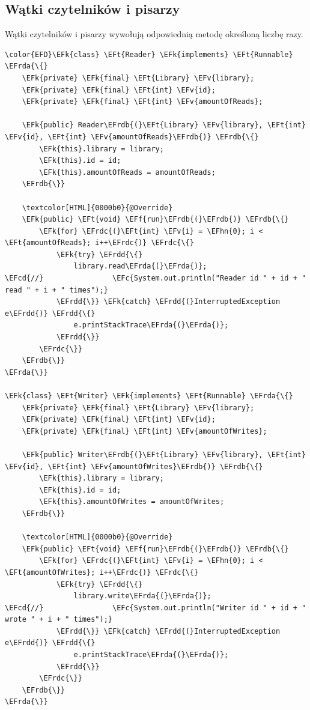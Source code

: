\documentclass[11pt]{article}
\newcommand{\EFc}[1]{\textcolor{EFc}{\textit{#1}}} %
\newcommand{\EFcd}[1]{\textcolor{EFcd}{\textit{#1}}} %
\newcommand{\EFk}[1]{\textcolor{EFk}{#1}} %
\newcommand{\EFf}[1]{\textcolor{EFf}{#1}} %
\newcommand{\EFv}[1]{\textcolor{EFv}{#1}} %
\newcommand{\EFt}[1]{\textcolor{EFt}{#1}} %
\newcommand{\EFhn}[1]{\textcolor{EFhn}{#1}} %
\newcommand{\EFrda}[1]{#1} %
\newcommand{\EFrdb}[1]{\textcolor{EFrdb}{#1}} %
\newcommand{\EFrdc}[1]{\textcolor{EFrdc}{#1}} %
\newcommand{\EFrdd}[1]{\textcolor{EFrdd}{#1}} %
\begin{document}
\subsection*{Wątki czytelników i pisarzy}
\label{sec:org8f20789}
Wątki czytelników i pisarzy wywołują odpowiednią metodę określoną liczbę razy.

\begin{Code}
\begin{Verbatim}
\color{EFD}\EFk{class} \EFt{Reader} \EFk{implements} \EFt{Runnable} \EFrda{\{}
    \EFk{private} \EFk{final} \EFt{Library} \EFv{library};
    \EFk{private} \EFk{final} \EFt{int} \EFv{id};
    \EFk{private} \EFk{final} \EFt{int} \EFv{amountOfReads};

    \EFk{public} Reader\EFrdb{(}\EFt{Library} \EFv{library}, \EFt{int} \EFv{id}, \EFt{int} \EFv{amountOfReads}\EFrdb{)} \EFrdb{\{}
        \EFk{this}.library = library;
        \EFk{this}.id = id;
        \EFk{this}.amountOfReads = amountOfReads;
    \EFrdb{\}}

    \textcolor[HTML]{0000b0}{@Override}
    \EFk{public} \EFt{void} \EFf{run}\EFrdb{(}\EFrdb{)} \EFrdb{\{}
        \EFk{for} \EFrdc{(}\EFt{int} \EFv{i} = \EFhn{0}; i < \EFt{amountOfReads}; i++\EFrdc{)} \EFrdc{\{}
            \EFk{try} \EFrdd{\{}
                library.read\EFrda{(}\EFrda{)};
\EFcd{//}                \EFc{System.out.println("Reader id " + id + " read " + i + " times");}
            \EFrdd{\}} \EFk{catch} \EFrdd{(}InterruptedException e\EFrdd{)} \EFrdd{\{}
                e.printStackTrace\EFrda{(}\EFrda{)};
            \EFrdd{\}}
        \EFrdc{\}}
    \EFrdb{\}}
\EFrda{\}}

\EFk{class} \EFt{Writer} \EFk{implements} \EFt{Runnable} \EFrda{\{}
    \EFk{private} \EFk{final} \EFt{Library} \EFv{library};
    \EFk{private} \EFk{final} \EFt{int} \EFv{id};
    \EFk{private} \EFk{final} \EFt{int} \EFv{amountOfWrites};

    \EFk{public} Writer\EFrdb{(}\EFt{Library} \EFv{library}, \EFt{int} \EFv{id}, \EFt{int} \EFv{amountOfWrites}\EFrdb{)} \EFrdb{\{}
        \EFk{this}.library = library;
        \EFk{this}.id = id;
        \EFk{this}.amountOfWrites = amountOfWrites;
    \EFrdb{\}}

    \textcolor[HTML]{0000b0}{@Override}
    \EFk{public} \EFt{void} \EFf{run}\EFrdb{(}\EFrdb{)} \EFrdb{\{}
        \EFk{for} \EFrdc{(}\EFt{int} \EFv{i} = \EFhn{0}; i < \EFt{amountOfWrites}; i++\EFrdc{)} \EFrdc{\{}
            \EFk{try} \EFrdd{\{}
                library.write\EFrda{(}\EFrda{)};
\EFcd{//}                \EFc{System.out.println("Writer id " + id + " wrote " + i + " times");}
            \EFrdd{\}} \EFk{catch} \EFrdd{(}InterruptedException e\EFrdd{)} \EFrdd{\{}
                e.printStackTrace\EFrda{(}\EFrda{)};
            \EFrdd{\}}
        \EFrdc{\}}
    \EFrdb{\}}
\EFrda{\}}
\end{Verbatim}
\end{Code}
\end{document}
